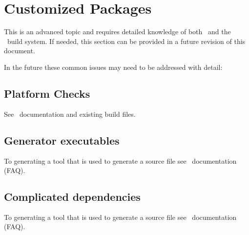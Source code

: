 \section{Customized Packages}
\label{sec:customize}

This is an advanced topic and requires detailed knowledge of both \cmake\ and the \draco\ build system.  If needed, this section can be provided in a future revision of this document.

In the future these common issues may need to be addressed with detail:

\subsection{Platform Checks}
\label{sec:platformcheck}

See \cmake\ documentation and existing build files.

\subsection{Generator executables}
\label{sec:generator_executable}
To generating a tool that is used to generate a source file see \cmake\ documentation (FAQ).

\subsection{Complicated dependencies}
\label{sec:complicated_deps}
To generating a tool that is used to generate a source file see \cmake\ documentation (FAQ).




